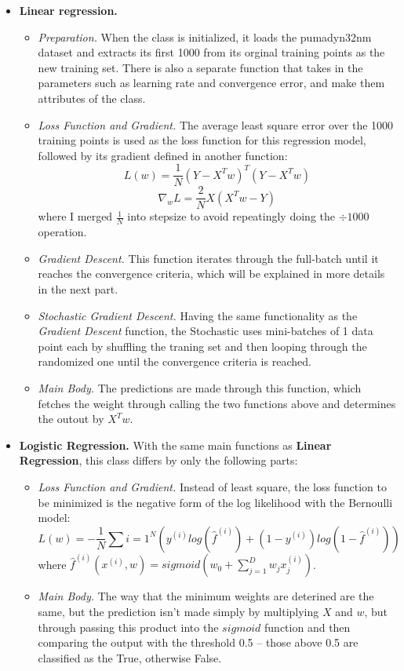 \documentclass{article} %
\begin{document}
\begin{itemize}
  \item \textbf{Linear regression.}
    \begin{itemize}
    \item \textit{Preparation.} When the class is initialized, it loads the pumadyn32nm dataset and extracts its first 1000 from its orginal training points as the new training set. There is also a separate function that takes in the parameters such as learning rate and convergence error, and make them attributes of the class.

    \item \textit{Loss Function and Gradient.} The average least square error over the 1000 training points is used as the loss function for this regression model, followed by its gradient defined in another function:
    $$L(w) = \frac{1}{N}(Y-X^Tw)^T(Y-X^Tw)$$
    $$\nabla_wL = \frac{2}{N}X(X^Tw-Y)$$
    where I merged $\frac{1}{N}$ into stepsize to avoid repeatingly doing the $\div 1000$ operation.

    \item \textit{Gradient Descent.} This function iterates through the full-batch until it reaches the convergence criteria, which will be explained in more details in the next part.

    \item \textit{Stochastic Gradient Descent.} Having the same functionality as the \textit{Gradient Descent} function, the Stochastic uses mini-batches of 1 data point each by shuffling the traning set and then looping through the randomized one until the convergence criteria is reached.

    \item \textit{Main Body.} The predictions are made through this function, which fetches the weight through calling the two functions above and determines the outout by $X^Tw$.
  \end{itemize}

  \item \textbf{Logistic Regression.} With the same main functions as \textbf{Linear Regression}, this class differs by only the following parts:
  \begin{itemize}
    \item \textit{Loss Function and Gradient.} Instead of least square, the loss function to be minimized is the negative form of the log likelihood with the Bernoulli model:
    $$L(w) = -\frac{1}{N}\sum{i=1}^N(y^{(i)}log(\hat f^{(i)}) + (1 - y^{(i)})log(1 - \hat f^{(i)}))$$ where $\hat f^{(i)}(x^{(i)}, w) = sigmoid(w_0 + \sum_{j=1}^D w_jx_j^{(i)})$.

    \item \textit{Main Body.} The way that the minimum weights are deterined are the same, but the prediction isn't made simply by multiplying $X$ and $w$, but through passing this product into the $sigmoid$ function and then comparing the output with the threshold 0.5 -- those above 0.5 are classified as the True, otherwise False.
  \end{itemize}
\end{itemize}
\end{document}
